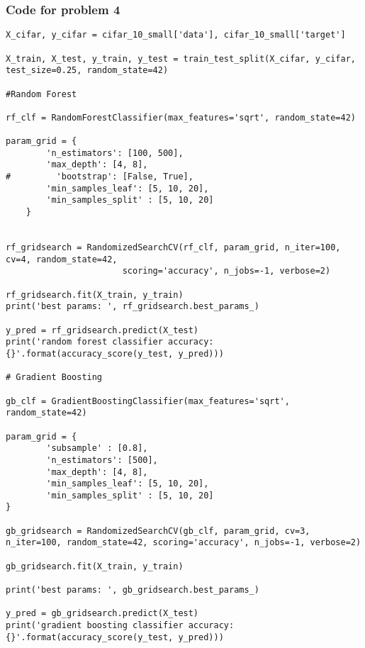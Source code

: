 \documentclass[12pt]{article}%
\begin{document}
\subsubsection*{Code for problem 4}
\begin{lstlisting}
X_cifar, y_cifar = cifar_10_small['data'], cifar_10_small['target']

X_train, X_test, y_train, y_test = train_test_split(X_cifar, y_cifar, test_size=0.25, random_state=42)

#Random Forest

rf_clf = RandomForestClassifier(max_features='sqrt', random_state=42)

param_grid = {
        'n_estimators': [100, 500],
        'max_depth': [4, 8],
#         'bootstrap': [False, True],
        'min_samples_leaf': [5, 10, 20],
        'min_samples_split' : [5, 10, 20] 
    }


rf_gridsearch = RandomizedSearchCV(rf_clf, param_grid, n_iter=100, cv=4, random_state=42,
                       scoring='accuracy', n_jobs=-1, verbose=2)

rf_gridsearch.fit(X_train, y_train)
print('best params: ', rf_gridsearch.best_params_)

y_pred = rf_gridsearch.predict(X_test)
print('random forest classifier accuracy: {}'.format(accuracy_score(y_test, y_pred)))

# Gradient Boosting

gb_clf = GradientBoostingClassifier(max_features='sqrt', random_state=42)

param_grid = {
        'subsample' : [0.8],
        'n_estimators': [500],
        'max_depth': [4, 8],
        'min_samples_leaf': [5, 10, 20],
        'min_samples_split' : [5, 10, 20]
}

gb_gridsearch = RandomizedSearchCV(gb_clf, param_grid, cv=3, n_iter=100, random_state=42, scoring='accuracy', n_jobs=-1, verbose=2)

gb_gridsearch.fit(X_train, y_train)

print('best params: ', gb_gridsearch.best_params_)

y_pred = gb_gridsearch.predict(X_test)
print('gradient boosting classifier accuracy: {}'.format(accuracy_score(y_test, y_pred)))
\end{lstlisting}
\end{document}

